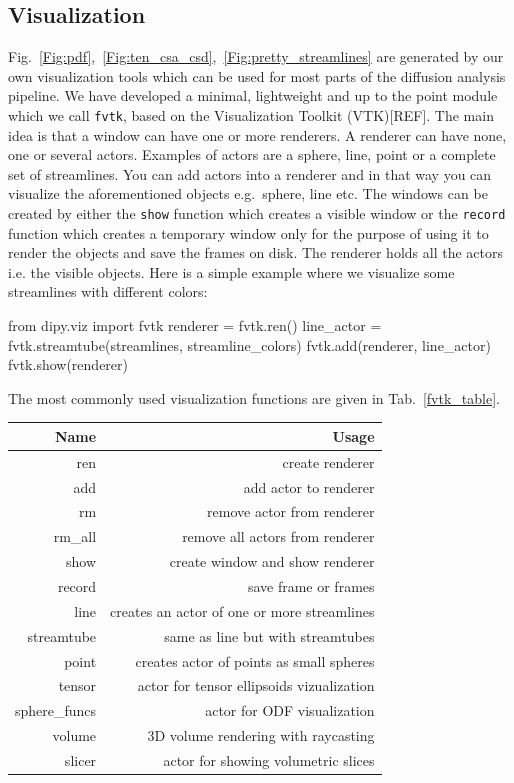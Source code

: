 \documentclass{bioinfo}
\begin{document}
\subsection{Visualization}
Fig.~\ref{Fig:pdf},~\ref{Fig:ten_csa_csd},~\ref{Fig:pretty_streamlines}
are generated by
our own visualization tools which can be used for most parts of the diffusion
analysis pipeline. We have developed a minimal, lightweight and up to the point
module which we call
\texttt{fvtk}, 
based on the Visualization Toolkit (VTK)[REF]. 
The main idea is that a window can have one or more renderers.
A renderer can have none, one or several actors. Examples of actors are a sphere,
line, point or a complete set of streamlines. You can add actors into a
renderer and in that way you can visualize the aforementioned objects
e.g.~sphere, line etc. The windows can
be created by either the \texttt{show} function which creates a visible window
or the \texttt{record} function which creates a temporary window only for the
purpose of using it to render the objects and save the frames on disk. The
renderer holds all the actors i.e. the visible objects. Here is a simple example
where we visualize some streamlines with different colors:
\begin{python}
from dipy.viz import fvtk
renderer = fvtk.ren()
line_actor = fvtk.streamtube(streamlines,
                              streamline_colors)
fvtk.add(renderer, line_actor)
fvtk.show(renderer)
\end{python}
The most commonly used visualization functions are given in Tab.~\ref{fvtk_table}.

\begin{table}[th] 
{\begin{tabular}{rr} \hline
Name & Usage \\ \hline
ren & create renderer\\
add & add actor to renderer\\
rm  & remove actor from renderer \\
rm\_all & remove all actors from renderer \\
show & create window and show renderer \\
record & save frame or frames \\
line & creates an actor of one or more streamlines \\
streamtube & same as line but with streamtubes \\
point & creates actor of points as small spheres \\
tensor & actor for tensor ellipsoids vizualization\\
sphere\_funcs & actor for ODF visualization \\
volume & 3D volume rendering with raycasting \\
slicer & actor for showing volumetric slices \\
\hline
\end{tabular}}{}
\end{table}
\end{document}

